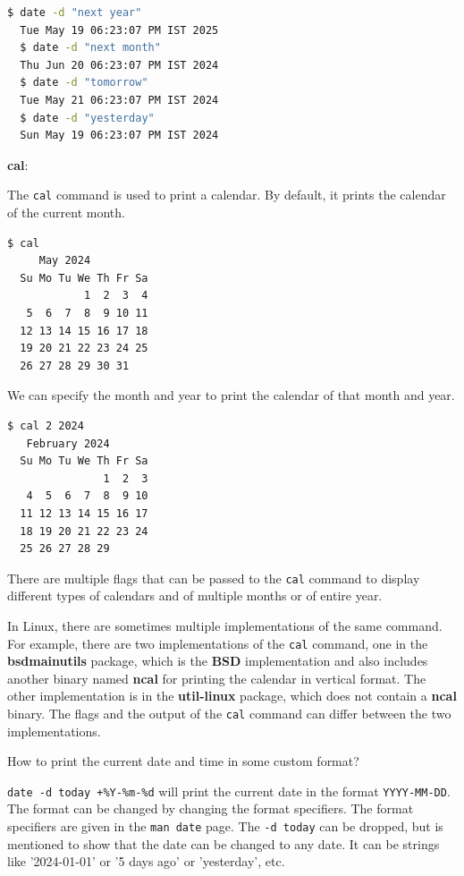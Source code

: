 \begin{lstlisting}[language=bash]
  $ date -d "next year"
  Tue May 19 06:23:07 PM IST 2025
  $ date -d "next month"
  Thu Jun 20 06:23:07 PM IST 2024
  $ date -d "tomorrow"
  Tue May 21 06:23:07 PM IST 2024
  $ date -d "yesterday"
  Sun May 19 06:23:07 PM IST 2024
\end{lstlisting}

\textbf{cal}:

The \lstinline|cal| command is used to print a calendar.
By default, it prints the calendar of the current month.

\begin{lstlisting}[language=bash]
  $ cal
     May 2024
  Su Mo Tu We Th Fr Sa
            1  2  3  4
   5  6  7  8  9 10 11
  12 13 14 15 16 17 18
  19 20 21 22 23 24 25
  26 27 28 29 30 31
\end{lstlisting}

We can specify the month and year to print the calendar of that month and year.

\begin{lstlisting}[language=bash]
  $ cal 2 2024
   February 2024
  Su Mo Tu We Th Fr Sa
               1  2  3
   4  5  6  7  8  9 10
  11 12 13 14 15 16 17
  18 19 20 21 22 23 24
  25 26 27 28 29
\end{lstlisting}

There are multiple flags that can be passed to the \lstinline|cal| command to display different types of calendars and of multiple months or of entire year.

\begin{remark}
  In Linux, there are sometimes multiple implementations of the same command.
  For example, there are two implementations of the \lstinline|cal| command, one in the \textbf{bsdmainutils} package, which is the \textbf{BSD} implementation and also includes another binary named \textbf{ncal} for printing the calendar in vertical format.
  The other implementation is in the \textbf{util-linux} package, which does not contain a \textbf{ncal} binary.
  The flags and the output of the \lstinline|cal| command can differ between the two implementations.
\end{remark}

\begin{qs}
  How to print the current date and time in some custom format?
\end{qs}

\begin{ans}
  \lstinline|date -d today +%Y-%m-%d| will print the current date in the format
  \lstinline|YYYY-MM-DD|. The format can be changed by changing the format specifiers.
  The format specifiers are given in the \lstinline|man date| page. The \lstinline|-d today| can
  be dropped, but is mentioned to show that the date can be changed to any date.
  It can be strings like '2024-01-01' or '5 days ago' or 'yesterday', etc.
\end{ans}

